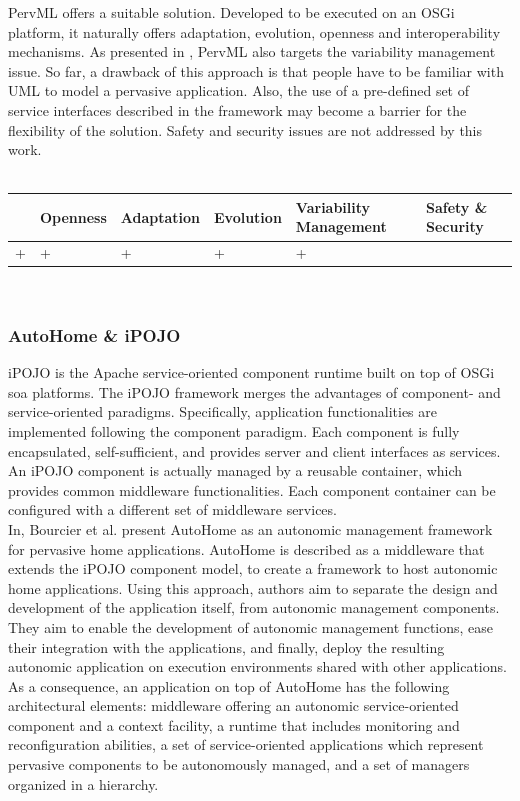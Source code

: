 PervML offers a suitable solution. Developed to be executed on an OSGi platform, it naturally offers adaptation, evolution, openness and interoperability mechanisms. As presented in \cite{Cetina:2009}, PervML also targets the variability management issue. So far, a drawback of this approach is that people have to be familiar with UML to model a pervasive application. Also, the use of a pre-defined set of service interfaces described in the framework may become a barrier for the flexibility of the solution. Safety and security issues are not addressed by this work.\\
\\
\begin{tabular}{ >{\centering}m{}| >{\centering}m{} >{\centering}m{}| >{\centering}m{} >{\centering}m{}| >{\centering\arraybackslash}m{}}
{\tiny Interoperability} & {\tiny Openness} & {\tiny Adaptation} & {\tiny Evolution} & {\tiny Variability Management} & {\tiny Safety \& Security}\\
 \hline
 + & + & + & + & + & \\ 
  \hline
\end{tabular}\\


\subsubsection{AutoHome \& iPOJO}
iPOJO\cite{Escoffier:2007} is the Apache service-oriented component runtime built on top of OSGi \gls{soa} platforms. The iPOJO framework merges the advantages of component- and service-oriented paradigms. Specifically, application functionalities are implemented following the component paradigm. Each component is fully encapsulated, self-sufficient, and provides server and client interfaces as services. An iPOJO component is actually managed by a reusable container, which provides common middleware functionalities. Each component container can be configured with a different set of middleware services.\\
In\cite{Bourcier:2011}, Bourcier et al. present AutoHome as an autonomic management framework for pervasive home applications. AutoHome is described as a middleware that extends the iPOJO component model, to create a framework to host autonomic home applications. Using this approach, authors aim to separate the design and development of the application itself, from autonomic management components. They aim to enable the development of autonomic management functions, ease their integration with the applications, and finally, deploy the resulting autonomic application on execution environments shared with other applications. As a consequence, an application on top of AutoHome has the following architectural elements: middleware offering an autonomic service-oriented component and a context facility, a runtime that includes monitoring and reconfiguration abilities, a set of service-oriented applications which represent pervasive components to be autonomously managed, and a set of managers organized in a hierarchy.\\


